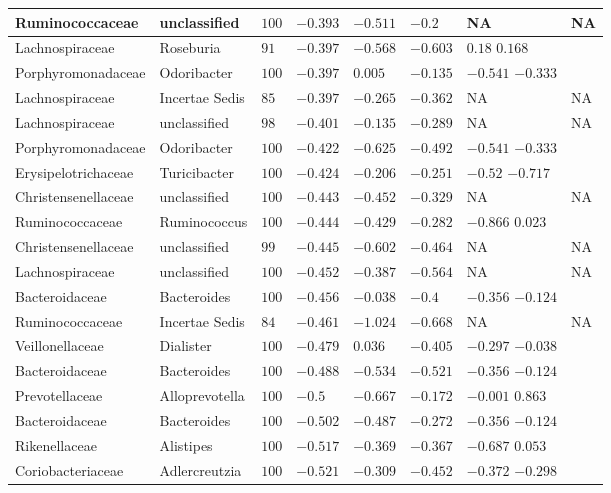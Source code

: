 \begin{table}[!ht]
\begin{tiny}
\begin{tabular}{|l|l|l|l|l|l|l|l|}
Ruminococcaceae & unclassified & $100$ & $-0.393$ & $-0.511$ & $-0.2$ & NA & NA \\ \hline
Lachnospiraceae & Roseburia & $91$ & $-0.397$ & $-0.568$ & $-0.603$ & $0.18$ $0.168$ & \\ \hline
Porphyromonadaceae & Odoribacter & $100$ & $-0.397$ & $0.005$ & $-0.135$ & $-0.541$ $-0.333$ & \\ \hline
Lachnospiraceae & Incertae Sedis & $85$ & $-0.397$ & $-0.265$ & $-0.362$ & NA & NA \\ \hline
Lachnospiraceae & unclassified & $98$ & $-0.401$ & $-0.135$ & $-0.289$ & NA & NA \\ \hline
Porphyromonadaceae & Odoribacter & $100$ & $-0.422$ & $-0.625$ & $-0.492$ & $-0.541$ $-0.333$ & \\ \hline
Erysipelotrichaceae & Turicibacter & $100$ & $-0.424$ & $-0.206$ & $-0.251$ & $-0.52$ $-0.717$ & \\ \hline
Christensenellaceae & unclassified & $100$ & $-0.443$ & $-0.452$ & $-0.329$ & NA & NA \\ \hline
Ruminococcaceae & Ruminococcus & $100$ & $-0.444$ & $-0.429$ & $-0.282$ & $-0.866$ $0.023$ & \\ \hline
Christensenellaceae & unclassified & $99$ & $-0.445$ & $-0.602$ & $-0.464$ & NA & NA \\ \hline
Lachnospiraceae & unclassified & $100$ & $-0.452$ & $-0.387$ & $-0.564$ & NA & NA \\ \hline
Bacteroidaceae & Bacteroides & $100$ & $-0.456$ & $-0.038$ & $-0.4$ & $-0.356$ $-0.124$ & \\ \hline
Ruminococcaceae & Incertae Sedis & $84$ & $-0.461$ & $-1.024$ & $-0.668$ & NA & NA \\ \hline
Veillonellaceae & Dialister & $100$ & $-0.479$ & $0.036$ & $-0.405$ & $-0.297$ $-0.038$ & \\ \hline
Bacteroidaceae & Bacteroides & $100$ & $-0.488$ & $-0.534$ & $-0.521$ & $-0.356$ $-0.124$ & \\ \hline
Prevotellaceae & Alloprevotella & $100$ & $-0.5$ & $-0.667$ & $-0.172$ & $-0.001$ $0.863$ & \\ \hline
Bacteroidaceae & Bacteroides & $100$ & $-0.502$ & $-0.487$ & $-0.272$ & $-0.356$ $-0.124$ & \\ \hline
Rikenellaceae & Alistipes & $100$ & $-0.517$ & $-0.369$ & $-0.367$ & $-0.687$ $0.053$ & \\ \hline
Coriobacteriaceae & Adlercreutzia & $100$ & $-0.521$ & $-0.309$ & $-0.452$ & $-0.372$ $-0.298$ & \\ \hline

\end{tabular}
\end{tiny}
\end{table}
